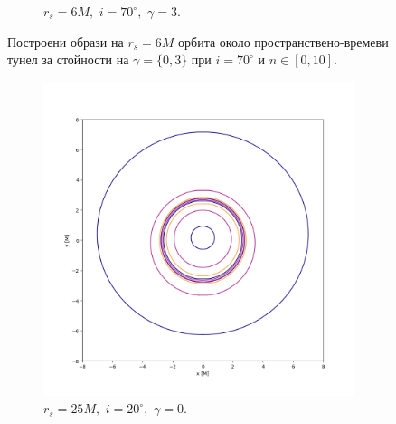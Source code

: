\begin{figure}[!htb]
\begin{subfigure}{6cm}
		\caption{$r_s = 6M,\,\, i = 70^\circ,\,\,\gamma = 3$.}
	\end{subfigure}
	\caption[Построени образи на $r_s = 6M$ орбита около пространствено-времеви тунел за различни стойности на $\gamma$ при $i \ 70^\circ$.]{\small Построени образи на $r_s = 6M$ орбита около пространствено-времеви тунел за стойности на $\gamma = \{0, 3\}$ при $i = 70^\circ$ и $n\in[0,10]$.} 
\label{WH_gamma_70_deg}
\end{figure}
\begin{figure}[!htb]
	\begin{subfigure}{6cm}
		\includegraphics[scale = 0.3]{WH_20_deg_r6_gamma_0.png}
		\caption{$r_s = 25M,\,\, i = 20^\circ,\,\,\gamma = 0$.}
	\end{subfigure}\,\,\,
	\begin{subfigure}{6cm}

\end{subfigure}
\end{figure}

